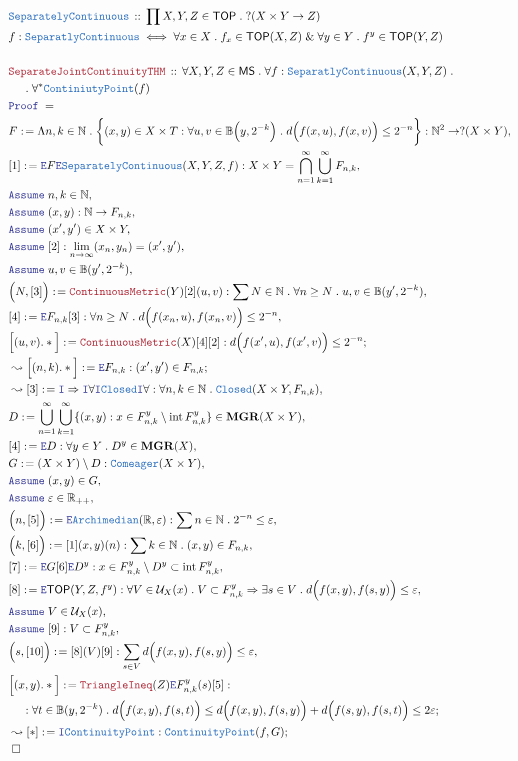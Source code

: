 \documentclass[12pt]{scrartcl}
\newcommand{\TYPE}[1]{\textcolor{NavyBlue}{\mathtt{#1}}}
\newcommand{\LOGIC}[1]{\textcolor{Blue}{\mathtt{#1}}}
\newcommand{\THM}[1]{\textcolor{Maroon}{\mathtt{#1}}}
\renewcommand{\.}{\; . \;}
\newcommand{\de}{: \kern 0.1pc =}
\newcommand{\Theorem}[2]{& \THM{#1} \, :: \, #2 \\ & \Proof = \\ }
\newcommand{\DeclareType}[2]{& \TYPE{#1} \, :: \, #2 \\}
\newcommand{\DefineType}[3]{& #1 : \TYPE{#2} \iff #3 \\}
\newcommand{\NewLine}{\\ & \kern 1pc}
\newcommand{\Page}[1]{ \begin{align*} #1 \end{align*}   }
\renewcommand{\And}{\; \& \;}
\newcommand{\Imply}{\Rightarrow}
\newcommand{\Intro}{\LOGIC{I}}
\newcommand{\Elim}{\LOGIC{E}}
\newcommand{\Reals}{\mathbb{R} }
\newcommand{\Nat}{\mathbb{N} }
\newcommand{\Say}[3]{& #1 \de #2 : #3, \\}
\newcommand{\SayIn}[3]{& #1 \de #2 \in #3, \\}
\newcommand{\Conclude}[3]{& #1 \de #2 : #3; \\}
\newcommand{\Derive}[3]{& \leadsto #1 \de #2 : #3, \\}
\newcommand{\DeriveConclude}[3]{& \leadsto #1 \de #2 : #3 ; \\}
\newcommand{\Assume}[2]{& \LOGIC{Assume} \; #1 : #2, \\}
\newcommand{\AssumeIn}[2]{& \LOGIC{Assume} \; #1 \in #2, \\}
\newcommand{\QED}{\; \square}
\newcommand{\EndProof}{& \QED \\}
\newcommand{\Proof}{\LOGIC{Proof} \; }
\DeclareMathOperator*{\intx}{int}
\newcommand{\TOP}{\mathsf{TOP}}
\newcommand{\U}{\mathcal{U}}
\newcommand{\MS}{\mathsf{MS}}
\newcommand{\MGR}{\mathbf{MGR}}
\begin{document}
\Page{
	\DeclareType{SeparatelyContinuous}
	{
		\prod X,Y,Z \in \TOP \.
		 ? (X\times Y \to Z) 
	}
	\DefineType{f}
	{
		SeparatlyContinuous	
	}
	{
		\forall x \in X \. f_x \in \TOP(X,Z)
		\And
		\forall  y \in Y \. f^y \in \TOP(Y,Z) 
	}
	\\
	\Theorem{SeparateJointContinuityTHM}
	{
			\forall X,Y,Z \in \MS \.
			\forall	f : \TYPE{SeparatlyContinuous}(X,Y,Z) \. \NewLine \.
			\forall^* \TYPE{ContiniutyPoint}(f)
	}
	\Say{F}
	{
		\Lambda n,k \in \Nat \. 
		\bigg\{ 
			(x,y) \in X \times T :
			\forall u,v \in \mathbb{B}\Big(y,2^{-k}\Big) \.
			d\Big( f(x,u), f(x,v) \Big) \le 2^{-n}      
		\bigg\}
	}
	{
		\Nat^2 \to ?(X \times Y)
	}
	\Say{[1]}{\Elim F \Elim \TYPE{SeparatelyContinuous}(X,Y,Z,f)}
	{
		X \times Y = \bigcap^\infty_{n=1} \bigcup_{k=1}^\infty F_{n,k}
	}
	\AssumeIn{n,k}{\Nat}
	\Assume{(x,y)}{\Nat \to F_{n,k}}
	\AssumeIn{(x',y')}{X \times Y}
	\Assume{[2]}{\lim_{n \to \infty} (x_n,y_n) = (x',y')}
	\AssumeIn{u,v}{\mathbb{B}(y',2^{-k})}
	\Say{\Big( N, [3] \Big)}{\THM{ContinuousMetric}(Y)[2](u,v)}
	{
		\sum N \in \Nat \. \forall n \ge N \. u,v \in \mathbb{B}(y',2^{-k})
	}
	\Say{[4]}{\Elim F_{n,k} [3]}
	{
		\forall n \ge N \. d\Big( f(x_n,u), f(x_n,v) \Big) \le 2^{-n} 
	}
	\Conclude{\Big[(u,v).*\Big]}
	{
		\THM{ContinuousMetric}(X)[4][2]
	}
	{
		 d\Big( f(x',u), f(x',v) \Big) \le 2^{-n} 
	}
	\DeriveConclude{\Big[(n,k).*\Big]}{\Elim F_{n,k}}
	{
		(x',y') \in F_{n,k}
	}
	\Derive{[3]}
	{
		\Intro \Imply
		\Intro \forall
		\Intro \TYPE{Closed}
		\Intro \forall
	}
	{
		\forall n,k \in \Nat \.
		\TYPE{Closed}(X\times Y, F_{n,k})
	}
	\SayIn{D}{ 
		\bigcup^\infty_{n=1} \bigcup^\infty_{k=1}
		\{
			(x,y) : x \in F^y_{n,k} \setminus \intx F^y_{n,k}
		\}     
	}{\MGR(X\times Y)}
	\Say{[4]}{
		\Elim D	
	}
	{
		\forall y \in Y \. D^y \in \MGR(X)
	}
	\Say{G}{(X \times Y) \setminus D}
	{
		\TYPE{Comeager}(X \times Y)
	}
	\AssumeIn{(x,y)}{G}
	\AssumeIn{\varepsilon}{\Reals_{++}}
	\Say{\Big(n,[5]\Big)}{\Elim \TYPE{Archimedian}(\Reals,\varepsilon)}
	{
		\sum n \in \Nat \.  2^{-n} \le \varepsilon
	}
	\Say{\Big(k,[6]\Big)}{[1](x,y)(n)}
	{
		\sum k \in \Nat \. (x,y) \in F_{n,k}
	}
	\Say{[7]}{\Elim G[6] \Elim D^y }
	{
		x \in F^y_{n,k} \setminus D^y \subset \intx F^y_{n,k}
	}
	\Say{[8]}{\Elim \TOP(Y,Z,f^y)}
	{
		\forall V \in \U_X(x) \. 
		V \subset F^y_{n,k} \Imply
		\exists s \in V \. 
		d\Big( f(x,y),f(s,y) \Big) \le \varepsilon 
	}
	\AssumeIn{V}{\U_X(x)}
	\Assume{[9]}{V \subset F^y_{n,k}}
	\Say{\Big(s,[10]\Big)}{[8](V)[9]}
	{
		\sum_{s \in V} d\Big( f(x,y),f(s,y) \Big) \le \varepsilon 
	}
	\Conclude{\Big[ (x,y).*\Big]}{\THM{TriangleIneq}(Z)\Elim F_{n,k}^y(s)[5]}
	{
		\NewLine :		
		\forall t \in \mathbb{B}(y,2^{-k}) \. 
		d\Big( f(x,y), f(s,t)\Big) \le
		d\Big( f(x,y), f(s,y)\Big) + 
		d\Big( f(s,y), f(s,t)\Big) \le 2\varepsilon
	}
	\DeriveConclude{[*]}{
		\Intro \TYPE{ContinuityPoint}
	}
	{
		\TYPE{ContinuityPoint}(f,G)
	}
	\EndProof	
}
\end{document}
